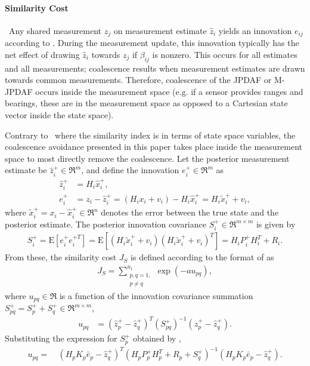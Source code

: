 \paragraph*{Similarity Cost}\ 
Any shared measurement $z_j$ on measurement estimate $\hat z_i$ yields an innovation $e_{ij}$ according to .
During the measurement update, this innovation typically has the net effect of drawing $\hat z_i$ towards $z_j$ if $\beta_{ij}$ is nonzero.
This occurs for all estimates and all measurements; coalescence results when measurement estimates are drawn towards common measurements.
Therefore, coalescence of the JPDAF or M-JPDAF occurs inside the measurement space (e.g. if a sensor provides ranges and bearings, these are in the measurement space as opposed to a Cartesian state vector inside the state space).

Contrary to~\cite{KauLovLee14} where the similarity index is in terms of state space variables, the coalescence avoidance presented in this paper takes place inside the measurement space to most directly remove the coalescence.
Let the posterior measurement estimate be $\hat z_i^+\in\Re^m$, and define the innovation $e_{i}^+\in\Re^m$ as
\begin{align}
\hat z_i^+&=H_i\hat x_i^+,
\\
e_{i}^+&=z_i-\hat z_i^+=(H_ix_i+v_i)-H_i\hat x_{i}^+=H_i\tilde x_i^++v_i,
\end{align}
where $\tilde x_i^+=x_i-\hat x_{i}^+\in\Re^n$ denotes the error between the true state and the posterior estimate. The posterior innovation covariance $S^+_i\in\Re^{m\times m}$ is given by
\begin{align}
S^+_i=\mathrm{E}[e_i^+e_i^{+T}]=\mathrm{E}[(H_i\tilde x_i^++v_i)(H_i\tilde x_i^++v_i)^T]
=H_iP^+_iH_i^T+R_i.\label{eqn:Spi}
\end{align}
From these, the similarity cost $J_S$ is defined according to the format of  as
\begin{align}
\label{eqn:Js}
J_S=\sum\limits_{\substack{p,q=1,\\p\neq q}}^{n_t}\exp (-au_{pq}),
\end{align}
where $u_{pq}\in\Re$ is a function of the innovation covariance summation $S^+_{pq}=S^+_{p}+S^+_{q}\in\Re^{m\times m}$,
\begin{align}
u_{pq} & = (\hat z_{p}^+-\hat z^+_{q})^T(S^+_{pq})^{-1}(\hat z^+_{p}-\hat z^+_{q})\label{eqn:U}.
\end{align}
Substituting the expression for $S_p^+$ obtained by ,
\begin{align}
u_{pq}=&\ 
(H_pK_p{\bar{e}}_p-\hat z^+_{q})^T
(H_pP^+_{p}H_p^T+R_p+S^+_q)^{-1}
(H_pK_p{\bar{e}}_p-\hat z^+_{q}).
\label{eqn:Up}
\end{align}


